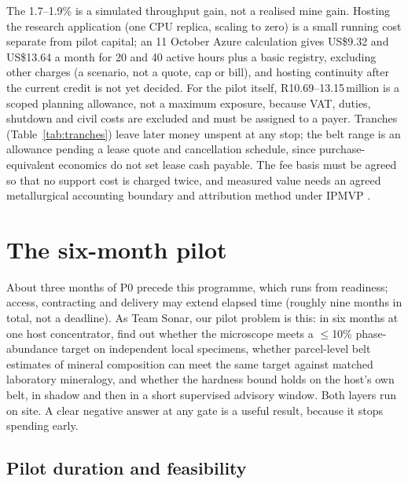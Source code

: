 \documentclass[10pt,a4paper,twocolumn]{article}
\begin{document}
The 1.7--1.9\% is a simulated throughput gain, not a realised mine gain. Hosting the research application (one CPU replica, scaling to zero) is a small running cost separate from pilot capital; an 11 October Azure calculation gives US\$9.32 and US\$13.64 a month for 20 and 40 active hours plus a basic registry, excluding other charges (a scenario, not a quote, cap or bill), and hosting continuity after the current credit is not yet decided. For the pilot itself, R10.69--13.15\,million is a scoped planning allowance, not a maximum exposure, because VAT, duties, shutdown and civil costs are excluded and must be assigned to a payer. Tranches (Table~\ref{tab:tranches}) leave later money unspent at any stop; the belt range is an allowance pending a lease quote and cancellation schedule, since purchase-equivalent economics do not set lease cash payable. The fee basis must be agreed so that no support cost is charged twice, and measured value needs an agreed metallurgical accounting boundary and attribution method under IPMVP \cite{ipmvp}.

\section{The six-month pilot}\label{sec:pilot}

About three months of P0 precede this programme, which runs from readiness; access, contracting and delivery may extend elapsed time (roughly nine months in total, not a deadline). As Team Sonar, our pilot problem is this: in six months at one host concentrator, find out whether the microscope meets a $\leq$10\% phase-abundance target on independent local specimens, whether parcel-level belt estimates of mineral composition can meet the same target against matched laboratory mineralogy, and whether the hardness bound holds on the host's own belt, in shadow and then in a short supervised advisory window. Both layers run on site. A clear negative answer at any gate is a useful result, because it stops spending early.

\subsection{Pilot duration and feasibility}
\end{document}
